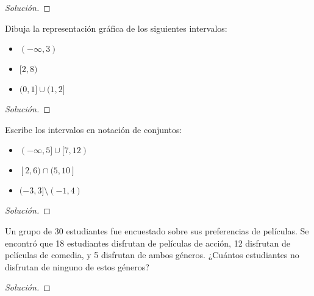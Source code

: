 \documentclass[a4,11pt]{aleph-notas}
\begin{document}
\begin{proof}[Solución]\hspace{0pt}
    
\end{proof}

\begin{ejer}
    Dibuja la representación gráfica de los siguientes intervalos:
    \begin{itemize}
        \item 
        $(-\infty, 3)$
        \item 
        $[2, 8)$
        \item 
        $(0, 1] \cup (1, 2]$
    \end{itemize}
\end{ejer}

\begin{proof}[Solución]\hspace{0pt}
    
\end{proof}

\begin{ejer}
    Escribe los intervalos en notación de conjuntos:
    \begin{itemize}
        \item 
        $(-\infty, 5] \cup [7, 12)$
        \item 
        $[2, 6) \cap (5, 10]$
        \item 
        $(-3, 3] \setminus (-1, 4)$
    \end{itemize}
\end{ejer}

\begin{proof}[Solución]\hspace{0pt}
    
\end{proof}

\begin{ejer}
    Un grupo de 30 estudiantes fue encuestado sobre sus preferencias de películas. Se encontró que 18 estudiantes disfrutan de películas de acción, 12 disfrutan de películas de comedia, y 5 disfrutan de ambos géneros. ¿Cuántos estudiantes no disfrutan de ninguno de estos géneros?
\end{ejer}

\begin{proof}[Solución]\hspace{0pt}
    
\end{proof}
\end{document}
